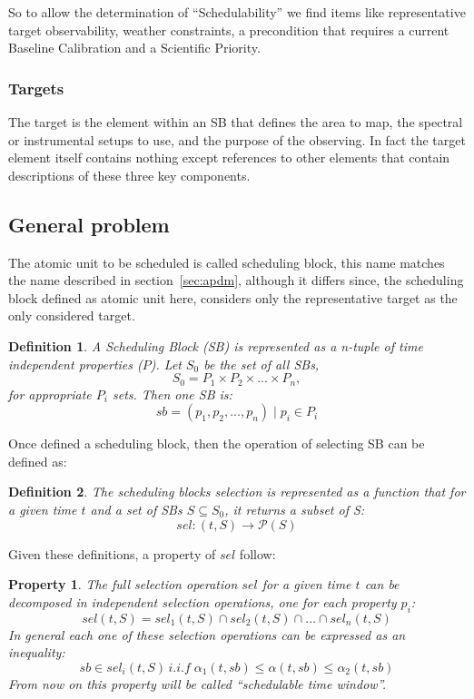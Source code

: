 \documentclass[11pt]{article}
\begin{document}
So to allow the determination of ``Schedulability'' we find items like representative target observability, weather constraints, a precondition that requires a current Baseline Calibration and a Scientific Priority.

\subsubsection*{Targets}
The target is the element within an SB that defines the area to map, the spectral or instrumental setups to use, and the purpose of the observing. In fact the target element itself contains nothing except references to other elements that contain descriptions of these three key components.

\subsection{General problem}
\newtheorem{problem-def}{Definition}
The atomic unit to be scheduled is called scheduling block, this name matches the name described in section~\ref{sec:apdm}, although it differs since, the scheduling block defined as atomic unit here, considers only the representative target as the only considered target.
\begin{problem-def}
A Scheduling Block (SB) is represented as a n-tuple of time independent  properties ($P$). Let $S_0$ be the set of all SBs,
$$S_0 = P_1 \times P_2 \times ... \times P_n,$$
for appropriate $P_i$ sets. Then one SB is:
$$sb = (p_1, p_2, ..., p_n) \mid p_i \in P_i$$
\end{problem-def} 

Once defined a scheduling block, then the operation of selecting SB can be defined as:
\begin{problem-def}
The scheduling blocks selection is represented as a function that for a given time $t$ and a set of SBs $S \subseteq S_0$, it returns a subset of S:
$$sel:(t,S) \rightarrow \mathcal P \left({S}\right)$$
\end{problem-def}

Given these definitions, a property of $sel$ follow:

\newtheorem{sel-props}{Property}
\begin{sel-props}
The full selection operation $sel$ for a given time $t$ can be decomposed in independent selection operations, one for each property $p_i$:
$$sel(t,S) = sel_1(t, S) \cap sel_2(t, S) \cap ... \cap sel_n(t,S)$$
In general each one of these selection operations can be expressed  as an inequality:
$$sb \in sel_i(t, S)\,i.i.f\;\alpha_1(t, sb) \leq \alpha(t, sb) \leq \alpha_2(t, sb)$$
From now on this property will be called ``schedulable time window''.
\end{sel-props}
\end{document}
